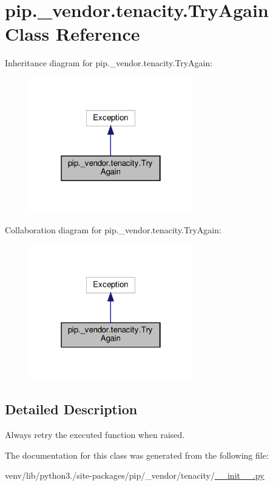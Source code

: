 \hypertarget{classpip_1_1__vendor_1_1tenacity_1_1TryAgain}{}\section{pip.\+\_\+vendor.\+tenacity.\+Try\+Again Class Reference}
\label{classpip_1_1__vendor_1_1tenacity_1_1TryAgain}


Inheritance diagram for pip.\+\_\+vendor.\+tenacity.\+Try\+Again\+:
\nopagebreak
\begin{figure}[H]
\begin{center}
\leavevmode
\includegraphics[width=202pt]{classpip_1_1__vendor_1_1tenacity_1_1TryAgain__inherit__graph}
\end{center}
\end{figure}


Collaboration diagram for pip.\+\_\+vendor.\+tenacity.\+Try\+Again\+:
\nopagebreak
\begin{figure}[H]
\begin{center}
\leavevmode
\includegraphics[width=202pt]{classpip_1_1__vendor_1_1tenacity_1_1TryAgain__coll__graph}
\end{center}
\end{figure}


\subsection{Detailed Description}
\begin{DoxyVerb}Always retry the executed function when raised.\end{DoxyVerb}
 

The documentation for this class was generated from the following file\+:\begin{DoxyCompactItemize}
\item 
venv/lib/python3./site-\/packages/pip/\+\_\+vendor/tenacity/\hyperlink{venv_2lib_2python3_89_2site-packages_2pip_2__vendor_2tenacity_2____init_____8py}{\+\_\+\+\_\+init\+\_\+\+\_\+.\+py}\end{DoxyCompactItemize}
